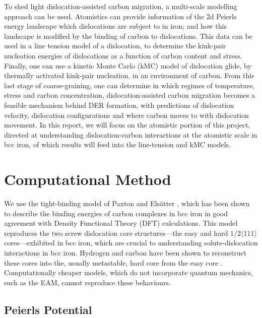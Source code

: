 \documentclass[a4paper,11pt]{article}
\begin{document}
To shed light dislocation-assisted carbon migration, a multi-scale modelling approach can be
used. Atomistics can provide information of the 2d Peierls energy landscape which dislocations are
subject to in iron; and how this landscape is modified by the binding of carbon to
dislocations. This data can be used in a line tension model of a dislocation, to determine the
kink-pair nucleation energies of dislocations as a function of carbon content and stress. Finally,
one can use a kinetic Monte Carlo (kMC) model of dislocation glide, by thermally activated kink-pair
nucleation, in an environment of carbon. From this last stage of coarse-graining, one can
determine in which regimes of temperature, stress and carbon concentration, dislocation-assisted
carbon migration becomes a feasible mechanism behind DER formation, with predictions of
dislocation velocity, dislocation configurations and where carbon moves to with dislocation
movement. In this report, we will focus on the atomistic portion of this project, directed at
understanding dislocation-carbon interactions at the atomistic scale in bcc iron, of which results will feed
into the line-tension and kMC models.







\section{Computational Method}
\label{sec:orgcf2aa96}

We use the tight-binding model of Paxton and Elsätter \cite{Paxton2013}, which has been shown to
describe the binding energies of carbon complexes in bcc iron in good agreement with Density
Functional Theory (DFT) calculations. This model reproduces the two screw dislocation core
structures---the easy and hard \(1/2\langle 111 \rangle\) cores---exhibited in bcc iron, which are crucial to
understanding solute-dislocation interactions in bcc iron. Hydrogen and carbon have been shown to
reconstruct these cores into the, usually metastable, hard core from the easy core
\cite{Ventelon2015,itakura13_effec_hydrog_atoms_screw_disloc}. Computationally cheaper models, which
do not incorporate quantum mechanics, such as the EAM, cannot reproduce these behaviours.

\subsection{Peierls Potential}
\label{sec:org60b66e6}
\end{document}
